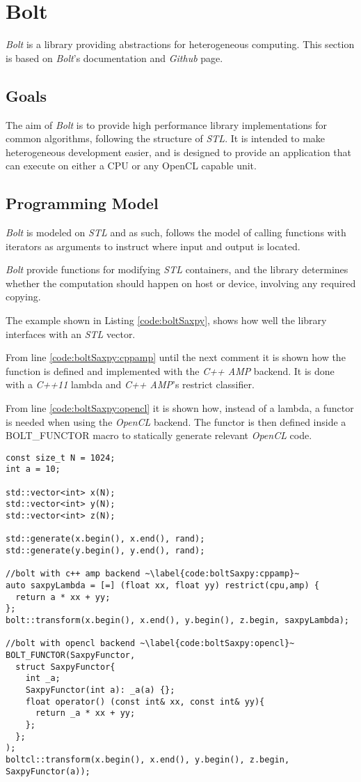 \section{Bolt}
\textit{Bolt} is a library providing abstractions for heterogeneous computing. This section is based on \textit{Bolt}'s documentation\cite{boltDoc} and \textit{Github} page\cite{boltGithub}.

\subsection{Goals}
The aim of \textit{Bolt} is to provide high performance library implementations for common algorithms, following the structure of \textit{STL}. It is intended to make heterogeneous development easier, and is designed to provide an application that can execute on either a CPU or any OpenCL capable unit.

\subsection{Programming Model}
\textit{Bolt} is modeled on \textit{STL} and as such, follows the model of calling functions with iterators as arguments to instruct where input and output is located.

\textit{Bolt} provide functions for modifying \textit{STL} containers, and the library determines whether the computation should happen on host or device, involving any required copying.

The example shown in Listing \ref{code:boltSaxpy}, shows how well the library interfaces with an \textit{STL} vector.

From line \ref{code:boltSaxpy:cppamp} until the next comment it is shown how the function is defined and implemented with the \textit{C++ AMP} backend. It is done with a \textit{C++11} lambda and \textit{C++ AMP}'s restrict classifier.

From line \ref{code:boltSaxpy:opencl} it is shown how, instead of a lambda, a functor is needed when using the \textit{OpenCL} backend. The functor is then defined inside a BOLT\_FUNCTOR macro to statically generate relevant \textit{OpenCL} code.

\begin{lstlisting}[caption={Bolt \textit{SAXPY} example}, label={code:boltSaxpy}]
const size_t N = 1024;
int a = 10;

std::vector<int> x(N);
std::vector<int> y(N);
std::vector<int> z(N);

std::generate(x.begin(), x.end(), rand);
std::generate(y.begin(), y.end(), rand);

//bolt with c++ amp backend ~\label{code:boltSaxpy:cppamp}~
auto saxpyLambda = [=] (float xx, float yy) restrict(cpu,amp) {
  return a * xx + yy;
};
bolt::transform(x.begin(), x.end(), y.begin(), z.begin, saxpyLambda);

//bolt with opencl backend ~\label{code:boltSaxpy:opencl}~
BOLT_FUNCTOR(SaxpyFunctor,
  struct SaxpyFunctor{
    int _a;
    SaxpyFunctor(int a): _a(a) {};
    float operator() (const int& xx, const int& yy){
      return _a * xx + yy;
    };
  };
);
boltcl::transform(x.begin(), x.end(), y.begin(), z.begin, SaxpyFunctor(a));
\end{lstlisting}


